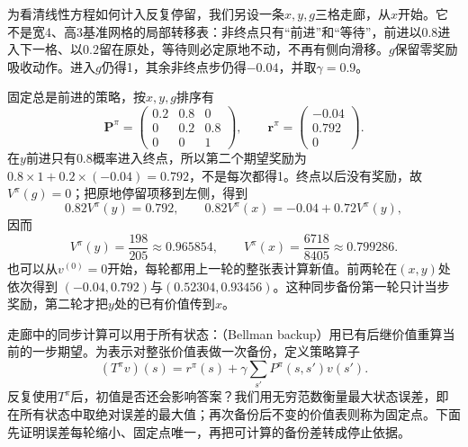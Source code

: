 \begin{example}[三个格子的独立手算模型]
 \label{ex:rl-planning-corridor}
 为看清线性方程如何计入反复停留，我们另设一条$x,y,g$三格走廊，从$x$开始。它不是宽4、高3基准网格的局部转移表：非终点只有“前进”和“等待”，前进以$0.8$进入下一格、以$0.2$留在原处，等待则必定原地不动，不再有侧向滑移。$g$保留零奖励吸收动作。进入$g$仍得1，其余非终点步仍得$-0.04$，并取$\gamma=0.9$。

 固定总是前进的策略，按$x,y,g$排序有
 \[
 \bm P^\pi=
 \begin{pmatrix}0.2&0.8&0\\0&0.2&0.8\\0&0&1\end{pmatrix},
 \qquad
 \bm r^\pi=\begin{pmatrix}-0.04\\0.792\\0\end{pmatrix}.
 \]
 在$y$前进只有$0.8$概率进入终点，所以第二个期望奖励为$0.8\times1+0.2\times(-0.04)=0.792$，不是每次都得1。终点以后没有奖励，故$V^\pi(g)=0$；把原地停留项移到左侧，得到
 \[
 0.82V^\pi(y)=0.792,\qquad
 0.82V^\pi(x)=-0.04+0.72V^\pi(y),
 \]
 因而
 \[
 V^\pi(y)=\frac{198}{205}\approx0.965854,\qquad
 V^\pi(x)=\frac{6718}{8405}\approx0.799286.
 \]
 也可以从$v^{(0)}=0$开始，每轮都用上一轮的整张表计算新值。前两轮在$(x,y)$处依次得到
 $(-0.04,0.792)$与$(0.52304,0.93456)$。这种同步备份第一轮只计当步奖励，第二轮才把$y$处的已有价值传到$x$。
\end{example}

走廊中的同步计算可以用于所有状态：（Bellman backup）用已有后继价值重算当前的一步期望。为表示对整张价值表做一次备份，定义策略算子
\begin{equation}
 (T^\pi v)(s)=r^\pi(s)+\gamma\sum_{s'}P^\pi(s,s')v(s').
 \label{eq:rl-planning-policy-operator}
\end{equation}
反复使用$T^\pi$后，初值是否还会影响答案？我们用无穷范数衡量最大状态误差，即在所有状态中取绝对误差的最大值；再次备份后不变的价值表则称为固定点。下面先证明误差每轮缩小、固定点唯一，再把可计算的备份差转成停止依据。

